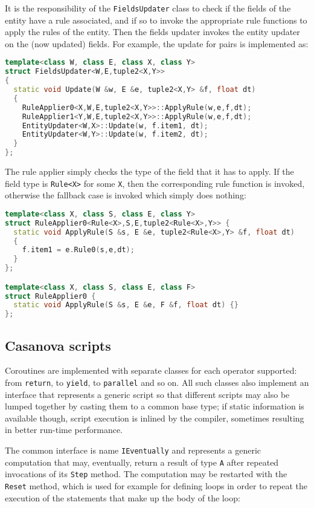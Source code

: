It is the responsibility of the \texttt{FieldsUpdater} class to check if the fields of the entity have a rule associated, and if so to invoke the appropriate rule functions to apply the rules of the entity. Then the fields updater invokes the entity updater on the (now updated) fields. For example, the update for pairs is implemented as:

\begin{lstlisting}[language=C++]
template<class W, class E, class X, class Y>
struct FieldsUpdater<W,E,tuple2<X,Y>>
{
  static void Update(W &w, E &e, tuple2<X,Y> &f, float dt)
  {
    RuleApplier0<X,W,E,tuple2<X,Y>>::ApplyRule(w,e,f,dt);
    RuleApplier1<Y,W,E,tuple2<X,Y>>::ApplyRule(w,e,f,dt);
    EntityUpdater<W,X>::Update(w, f.item1, dt);
    EntityUpdater<W,Y>::Update(w, f.item2, dt);
  }
};
\end{lstlisting}

The rule applier simply checks the type of the field that it has to apply. If the field type is \texttt{Rule<X>} for some \texttt{X}, then the corresponding rule function is invoked, otherwise the fallback case is invoked which simply does nothing:

\begin{lstlisting}[language=C++]
template<class X, class S, class E, class Y>
struct RuleApplier0<Rule<X>,S,E,tuple2<Rule<X>,Y>> {
  static void ApplyRule(S &s, E &e, tuple2<Rule<X>,Y> &f, float dt) 
  {
    f.item1 = e.Rule0(s,e,dt);
  }
};

template<class X, class S, class E, class F>
struct RuleApplier0 {
  static void ApplyRule(S &s, E &e, F &f, float dt) {}
};
\end{lstlisting}

\subsection{Casanova scripts}
Coroutines are implemented with separate classes for each operator supported: from \texttt{return}, to \texttt{yield}, to \texttt{parallel} and so on. All such classes also implement an interface that represents a generic script so that different scripts may also be lumped together by casting them to a common base type; if static information is available though, script execution is inlined by the compiler, sometimes resulting in better run-time performance.

The common interface is name \texttt{IEventually} and represents a generic computation that may, eventually, return a result of type \texttt{A} after repeated invocations of its \texttt{Step} method. The computation may be restarted with the \texttt{Reset} method, which is used for example for defining loops in order to repeat the execution of the statements that make up the body of the loop:

